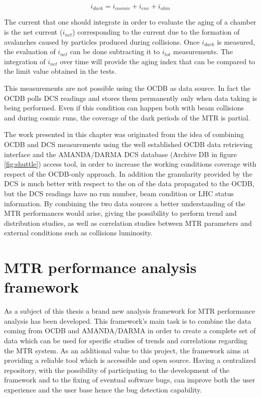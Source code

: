 \begin{equation}
\label{eq:idark}
i_{dark}=i_{cosmic}+i_{env}+i_{ohm}
\end{equation}

The current that one should integrate in order to evaluate the aging of a chamber is the net current ($i_{net}$) corresponding to the current due to the formation of avalanches caused by particles produced during collisions.
Once $i_{dark}$ is measured, the evaluation of $i_{net}$ can be done subtracting it to $i_{tot}$ measurements.
The integration of $i_{net}$ over time will provide the aging index that can be compared to the limit value obtained in the tests.

This measurements are not possible using the OCDB as data source.
In fact the OCDB polls DCS readings and stores them permanently only when data taking is being performed.
Even if this condition can happen both with beam collisions and during cosmic runs, the coverage of the dark periods of the MTR is partial.

The work presented in this chapter was originated from the idea of combining OCDB and DCS measurements using the well established OCDB data retrieving interface and the AMANDA/DARMA DCS database (Archive DB in figure \ref{fig:shuttle}) access tool, in order to increase the working conditions coverage with respect of the OCDB-only approach.
In addition the granularity provided by the DCS is much better with respect to the on of the data propagated to the OCDB, but the DCS readings have no run number, beam condition or LHC status information.
By combining the two data sources a better understanding of the MTR performances would arise, giving the possibility to perform trend and distribution studies, as well as correlation studies between MTR parameters and external conditions such as collisions luminosity.

\section{MTR performance analysis framework}
As a subject of this thesis a brand new analysis framework for MTR performance analysis has been developed.
This framework's main task is to combine the data coming from OCDB and AMANDA/DARMA in order to create a complete set of data which can be used for specific studies of trends and correlations regarding the MTR system.
As an additional value to this project, the framework aims at providing a reliable tool which is accessible and open source.
Having a centralized repository, with the possibility of participating to the development of the framework and to the fixing of eventual software bugs, can improve both the user experience and the user base hence the bug detection capability.

